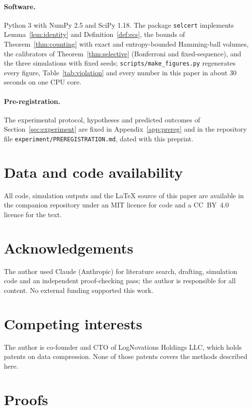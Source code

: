 \documentclass[11pt,letterpaper]{article}
\theoremstyle{plain}
\theoremstyle{definition}
\theoremstyle{remark}
\begin{document}
\paragraph{Software.} Python 3 with NumPy 2.5 and SciPy 1.18. The package \texttt{selcert} implements Lemma~\ref{lem:identity} and Definition~\ref{def:ecs}, the bounds of Theorem~\ref{thm:counting} with exact and entropy-bounded Hamming-ball volumes, the calibrators of Theorem~\ref{thm:selective} (Bonferroni and fixed-sequence), and the three simulations with fixed seeds; \texttt{scripts/make\_figures.py} regenerates every figure, Table~\ref{tab:violation} and every number in this paper in about 30 seconds on one CPU core.

\paragraph{Pre-registration.} The experimental protocol, hypotheses and predicted outcomes of Section~\ref{sec:experiment} are fixed in Appendix~\ref{app:prereg} and in the repository file \texttt{experiment/PREREGISTRATION.md}, dated with this preprint.

\section*{Data and code availability}
All code, simulation outputs and the LaTeX source of this paper are available in the companion repository under an MIT licence for code and a CC~BY~4.0 licence for the text.

\section*{Acknowledgements}
The author used Claude (Anthropic) for literature search, drafting, simulation code and an independent proof-checking pass; the author is responsible for all content. No external funding supported this work.

\section*{Competing interests}
The author is co-founder and CTO of LogNovations Holdings LLC, which holds patents on data compression. None of those patents covers the methods described here.




\clearpage
\appendix

\section{Proofs}
\label{app:proofs}
\end{document}
